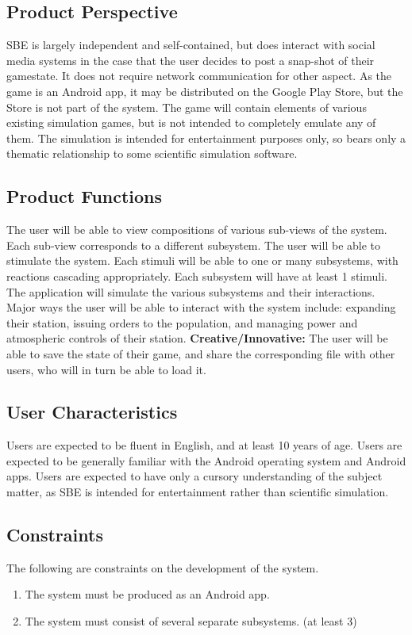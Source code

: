 \documentclass[]{article}
\begin{document}
\subsection{Product Perspective}
\label{sub:product_perspective}
	SBE is largely independent and self-contained, but does interact with social media systems in the case that the user decides to post a snap-shot of their gamestate. It does not require network communication for other aspect. As the game is an Android app, it may be distributed on the Google Play Store, but the Store is not part of the system. The game will contain elements of various existing simulation games, but is not intended to completely emulate any of them. The simulation is intended for entertainment purposes only, so bears only a thematic relationship to some scientific simulation software. 

\subsection{Product Functions}
\label{sub:product_functions}
The user will be able to view compositions of various sub-views of the system. Each sub-view corresponds to a different subsystem. The user will be able to stimulate the system. Each stimuli will be able to one or many subsystems, with reactions cascading appropriately. Each subsystem will have at least 1 stimuli. The application will simulate the various subsystems and their interactions. Major ways the user will be able to interact with the system include: expanding their station, issuing orders to the population, and managing power and atmospheric controls of their station. \textbf{Creative/Innovative:} The user will be able to save the state of their game, and share the corresponding file with other users, who will in turn be able to load it.

\subsection{User Characteristics}
\label{sub:user_characteristics}
	Users are expected to be fluent in English, and at least 10 years of age. Users are expected to be generally familiar with the Android operating system and Android apps. Users are expected to have only a cursory understanding of the subject matter, as SBE is intended for entertainment rather than scientific simulation.

\subsection{Constraints}
\label{sub:constraints}
	The following are constraints on the development of the system.
	\begin{enumerate}
		\item The system must be produced as an Android app.
		\item The system must consist of several separate subsystems. (at least 3)
	\end{enumerate}
\end{document}
